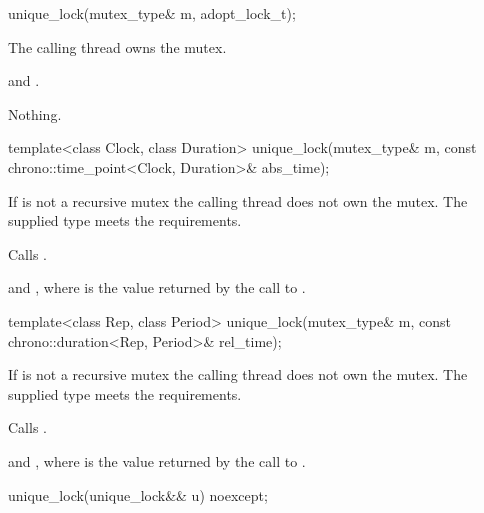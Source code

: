 %
\begin{itemdecl}
unique_lock(mutex_type& m, adopt_lock_t);
\end{itemdecl}

\begin{itemdescr}
\pnum
\expects
The calling thread owns the mutex.

\pnum
\ensures
{} and .

\pnum
\throws
Nothing.
\end{itemdescr}

%
\begin{itemdecl}
template<class Clock, class Duration>
  unique_lock(mutex_type& m, const chrono::time_point<Clock, Duration>& abs_time);
\end{itemdecl}

\begin{itemdescr}
\pnum
\expects
If  is not a recursive mutex the calling thread
does not own the mutex. The supplied  type meets the
 requirements.

\pnum
\effects
Calls .

\pnum
\ensures
{} and ,
where  is
the value returned by the call to .
\end{itemdescr}

%
\begin{itemdecl}
template<class Rep, class Period>
  unique_lock(mutex_type& m, const chrono::duration<Rep, Period>& rel_time);
\end{itemdecl}

\begin{itemdescr}
\pnum
\expects
If  is not a recursive mutex the calling thread does not own the mutex.
The supplied  type meets the  requirements.

\pnum
\effects
Calls .

\pnum
\ensures
{} and ,
where  is the value returned by the call to .
\end{itemdescr}

%
\begin{itemdecl}
unique_lock(unique_lock&& u) noexcept;
\end{itemdecl}

